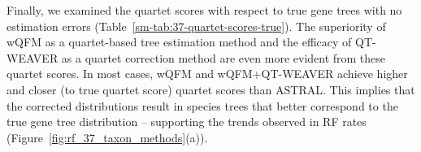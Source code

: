 \documentclass[10pt,a4paper]{article}
\begin{document}
Finally, we examined the quartet scores with respect to true gene trees with no estimation errors (Table~\ref{sm-tab:37-quartet-scores-true}). The superiority of wQFM as a quartet-based tree estimation method and the efficacy of QT-WEAVER as a quartet correction method are even more evident from these quartet scores. %
In most cases, wQFM and wQFM+QT-WEAVER achieve higher and closer (to true quartet score) quartet scores than ASTRAL. This implies that the corrected distributions result in species trees that better correspond to the true gene tree distribution -- supporting the trends observed in RF rates (Figure~\ref{fig:rf_37_taxon_methods}(a)). 







\end{document}
